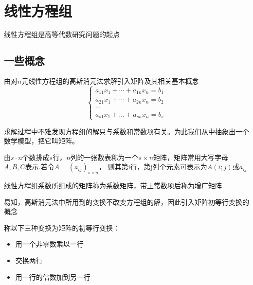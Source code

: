 \chapter{线性方程组}
线性方程组是高等代数研究问题的起点
\section{一些概念}
由对$n$元线性方程组的高斯消元法求解引入矩阵及其相关基本概念
\begin{equation*}
    \begin{cases}
        a_{11}x_1+\cdots+a_{1n}x_n=b_{1}\\
        a_{21}x_1+\cdots+a_{2n}x_n=b_{2}\\
        \cdots\\
        a_{s1}x_1+\dots+a_{sn}x_n=b_{s}
    \end{cases}
\end{equation*}

求解过程中不难发现方程组的解只与系数和常数项有关。为此我们从中抽象出一个数学模型，把它叫矩阵。
\begin{definition}
    由$s\cdot n$个数排成$s$行，$n$列的一张数表称为一个$s\times n$矩阵，矩阵常用大写字母$A,B,C$表示.若令$A=(a_{ij})_{s\times n}$，
    则其第i行，第j列个元素可表示为$A(i;j)$或$a_{ij}$
\end{definition}
\begin{definition}
    线性方程组系数所组成的矩阵称为系数矩阵，带上常数项后称为增广矩阵
\end{definition}

易知，高斯消元法中所用到的变换不改变方程组的解，因此引入矩阵初等行变换的概念
\begin{definition}
    称以下三种变换为矩阵的初等行变换：
    \begin{itemize}
        \item 用一个非零数乘以一行
        \item 交换两行
        \item 用一行的倍数加到另一行
    \end{itemize}
\end{definition}

